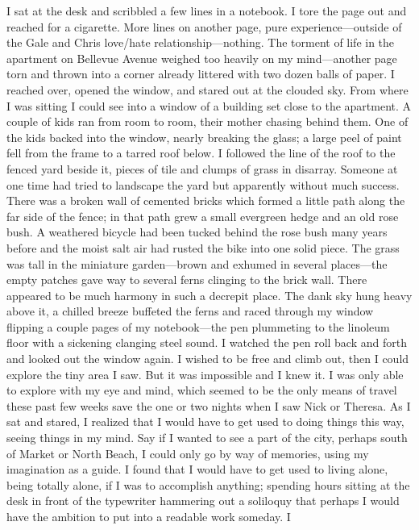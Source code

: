 I sat at the desk and scribbled a few lines in a notebook. I tore the
page out and reached for a cigarette. More lines on another page, pure
experience---outside of the Gale and Chris love/hate
relationship---nothing. The torment of life in the apartment on Bellevue
Avenue weighed too heavily on my mind---another page torn and thrown
into a corner already littered with two dozen balls of paper. I reached
over, opened the window, and stared out at the clouded sky. From where I
was sitting I could see into a window of a building set close to the
apartment. A couple of kids ran from room to room, their mother chasing
behind them. One of the kids backed into the window, nearly breaking the
glass; a large peel of paint fell from the frame to a tarred roof below.
I followed the line of the roof to the fenced yard beside it, pieces of
tile and clumps of grass in disarray. Someone at one time had tried to
landscape the yard but apparently without much success. There was a
broken wall of cemented bricks which formed a little path along the far
side of the fence; in that path grew a small evergreen hedge and an old
rose bush. A weathered bicycle had been tucked behind the rose bush many
years before and the moist salt air had rusted the bike into one solid
piece. The grass was tall in the miniature garden---brown and exhumed in
several places---the empty patches gave way to several ferns clinging to
the brick wall. There appeared to be much harmony in such a decrepit
place. The dank sky hung heavy above it, a chilled breeze buffeted the
ferns and raced through my window flipping a couple pages of my
notebook---the pen plummeting to the linoleum floor with a sickening
clanging steel sound. I watched the pen roll back and forth and looked
out the window again. I wished to be free and climb out, then I could
explore the tiny area I saw. But it was impossible and I knew it. I was
only able to explore with my eye and mind, which seemed to be the only
means of travel these past few weeks save the one or two nights when I
saw Nick or Theresa. As I sat and stared, I realized that I would have
to get used to doing things this way, seeing things in my mind. Say if I
wanted to see a part of the city, perhaps south of Market or North
Beach, I could only go by way of memories, using my imagination as a
guide. I found that I would have to get used to living alone, being
totally alone, if I was to accomplish anything; spending hours sitting
at the desk in front of the typewriter hammering out a soliloquy that
perhaps I would have the ambition to put into a readable work someday. I
